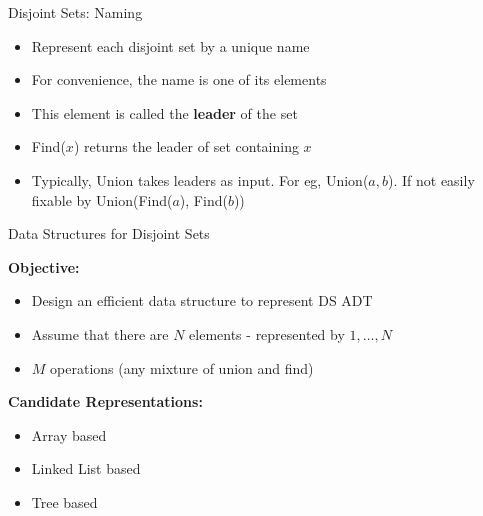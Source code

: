 \documentclass{beamer}
\begin{document}
\begin{frame}{Disjoint Sets: Naming}
    \begin{itemize}
        \item Represent each disjoint set by a unique name
        \item For convenience, the name is one of its elements
        \item This element is called the {\bf leader} of the set
        \item Find($x$) returns the leader of set containing $x$
        \item Typically, Union takes leaders as input. For eg, Union($a,b$). If not easily fixable by Union(Find($a$), Find($b$)) 
    \end{itemize}
\end{frame}

\begin{frame}{Data Structures for Disjoint Sets}

    {\bf Objective:} 
    \begin{itemize}
        \item Design an efficient data structure to represent DS ADT 
        \item Assume that there are $N$ elements - represented by $1, \ldots, N$
        \item $M$ operations (any mixture of union and find)
    \end{itemize}
    {\bf Candidate Representations:}
    \begin{itemize}
        \item Array based
        \item Linked List based
        \item Tree based
    \end{itemize}
\end{frame}
\end{document}
